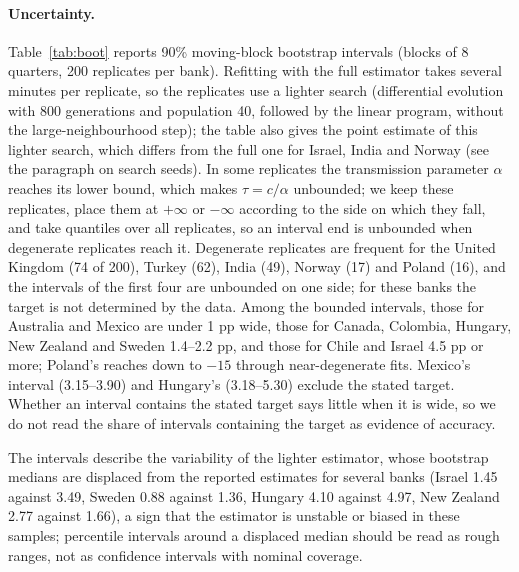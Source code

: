 \documentclass[11pt,a4paper]{article}
\theoremstyle{remark}\newtheorem{remark}{Remark}
\begin{document}
\paragraph{Uncertainty.} Table~\ref{tab:boot} reports 90\% moving-block bootstrap intervals (blocks of 8 quarters, 200 replicates per bank). Refitting with the full estimator takes several minutes per replicate, so the replicates use a lighter search (differential evolution with 800 generations and population 40, followed by the linear program, without the large-neighbourhood step); the table also gives the point estimate of this lighter search, which differs from the full one for Israel, India and Norway (see the paragraph on search seeds). In some replicates the transmission parameter $\alpha$ reaches its lower bound, which makes $\tau=c/\alpha$ unbounded; we keep these replicates, place them at $+\infty$ or $-\infty$ according to the side on which they fall, and take quantiles over all replicates, so an interval end is unbounded when degenerate replicates reach it. Degenerate replicates are frequent for the United Kingdom (74 of 200), Turkey (62), India (49), Norway (17) and Poland (16), and the intervals of the first four are unbounded on one side; for these banks the target is not determined by the data. Among the bounded intervals, those for Australia and Mexico are under 1 pp wide, those for Canada, Colombia, Hungary, New Zealand and Sweden 1.4--2.2 pp, and those for Chile and Israel 4.5 pp or more; Poland's reaches down to $-15$ through near-degenerate fits. Mexico's interval (3.15--3.90) and Hungary's (3.18--5.30) exclude the stated target. Whether an interval contains the stated target says little when it is wide, so we do not read the share of intervals containing the target as evidence of accuracy.

The intervals describe the variability of the lighter estimator, whose bootstrap medians are displaced from the reported estimates for several banks (Israel 1.45 against 3.49, Sweden 0.88 against 1.36, Hungary 4.10 against 4.97, New Zealand 2.77 against 1.66), a sign that the estimator is unstable or biased in these samples; percentile intervals around a displaced median should be read as rough ranges, not as confidence intervals with nominal coverage.
\end{document}
